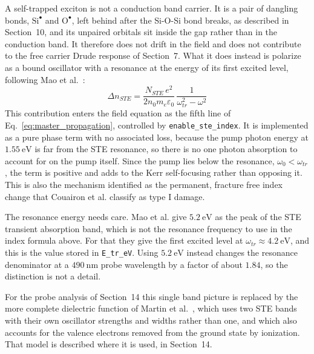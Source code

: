 A self-trapped exciton is not a conduction band carrier. It is a pair of dangling bonds, $\text{Si}^\bullet$ and $\text{O}^\bullet$, left behind after the Si-O-Si bond breaks, as described in Section~10, and its unpaired orbitals sit inside the gap rather than in the conduction band. It therefore does not drift in the field and does not contribute to the free carrier Drude response of Section~7. What it does instead is polarize as a bound oscillator with a resonance at the energy of its first excited level, following Mao et al.~\cite{mao2004}:
\begin{equation}
\Delta n_{STE} = \frac{N_{STE}\,e^2}{2n_0m_e\varepsilon_0}\,\frac{1}{\omega_{tr}^2-\omega^2}
\end{equation}
This contribution enters the field equation as the fifth line of Eq.~\eqref{eq:master_propagation}, controlled by \texttt{enable\_ste\_index}. It is implemented as a pure phase term with no associated loss, because the pump photon energy at $1.55\ \text{eV}$ is far from the STE resonance, so there is no one photon absorption to account for on the pump itself. Since the pump lies below the resonance, $\omega_0<\omega_{tr}$, the term is positive and adds to the Kerr self-focusing rather than opposing it. This is also the mechanism identified as the permanent, fracture free index change that Couairon et al. classify as type I damage.

The resonance energy needs care. Mao et al. give $5.2\ \text{eV}$ as the peak of the STE transient absorption band, which is not the resonance frequency to use in the index formula above. For that they give the first excited level at $\omega_{tr}\approx 4.2\ \text{eV}$, and this is the value stored in \texttt{E\_tr\_eV}. Using $5.2\ \text{eV}$ instead changes the resonance denominator at a $490\ \text{nm}$ probe wavelength by a factor of about $1.84$, so the distinction is not a detail.

For the probe analysis of Section~14 this single band picture is replaced by the more complete dielectric function of Martin et al.~\cite{martin1997}, which uses two STE bands with their own oscillator strengths and widths rather than one, and which also accounts for the valence electrons removed from the ground state by ionization. That model is described where it is used, in Section~14.
